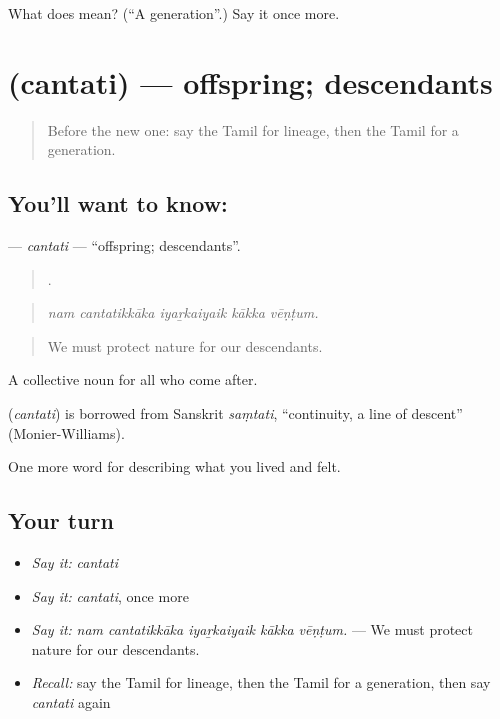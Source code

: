 \begin{tcolorbox}[breakable,colback=teal!4,colframe=teal!35!black,title={Before you move on}]
What does  mean? (\textquotedblleft{}A generation\textquotedblright{}.) Say it once more.
\end{tcolorbox}
\section[\texorpdfstring{\ta{சந்ததி} (cantati)}{சந்ததி (cantati)}]{ (cantati) — offspring; descendants}

\label{lesson:TA-C494-cantati}



\begin{quote}
Before the new one: say the Tamil for lineage, then the Tamil for a generation.
\end{quote}

\subsection*{You'll want to know: }
\textbf{} — \emph{cantati} — \textquotedblleft{}offspring; descendants\textquotedblright{}.

\begin{quote}
    .
\end{quote}

\begin{quote}
\emph{nam cantatikkāka iyaṟkaiyaik kākka vēṇṭum.}
\end{quote}

\begin{quote}
We must protect nature for our descendants.
\end{quote}

A collective noun for all who come after.

\begin{cousinweb}
\textbf{} (\emph{cantati}) is borrowed from Sanskrit \emph{saṃtati}, \textquotedblleft{}continuity, a line of descent\textquotedblright{} (Monier-Williams).
\end{cousinweb}

\begin{grammarlens}[title={What you've built}]
One more word for describing what you lived and felt.
\end{grammarlens}

\subsection*{Your turn}
\begin{itemize}
\raggedright
  \item \emph{Say it:} \emph{cantati}
  \item \emph{Say it:} \emph{cantati}, once more
  \item \emph{Say it:} \emph{nam cantatikkāka iyaṟkaiyaik kākka vēṇṭum.} — We must protect nature for our descendants.
  \item \emph{Recall:} say the Tamil for lineage, then the Tamil for a generation, then say \emph{cantati} again
\end{itemize}

